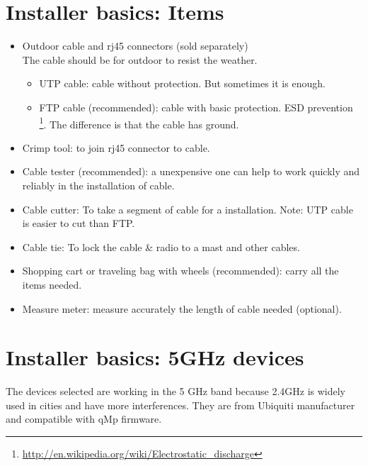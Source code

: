 \documentclass[11pt]{article}
\begin{document}
\section{Installer basics: Items}
\label{sec-2}
\begin{itemize}
\item Outdoor cable and rj45 connectors (sold separately) \\
  The cable should be for outdoor to resist the weather. 
\begin{itemize}
\item UTP cable: cable without protection. But sometimes it is enough.
\item FTP cable (recommended): cable with basic protection. ESD
prevention \footnote{\url{http://en.wikipedia.org/wiki/Electrostatic_discharge}}. The difference is that the cable has
ground.
\end{itemize}
\item Crimp tool: to join rj45 connector to cable.
\item Cable tester (recommended): a unexpensive one can help to work quickly and
reliably in the installation of cable.
\item Cable cutter: To take a segment of cable for a installation. Note:
UTP cable is easier to cut than FTP.
\item Cable tie: To lock the cable \& radio to a mast and other
cables.
\item Shopping cart or traveling bag with wheels (recommended): carry
all the items needed.
\item Measure meter: measure accurately the length of cable needed
(optional).
\end{itemize}
\section{Installer basics: 5GHz devices}
\label{sec-3}
The devices selected are working in the 5 GHz band because 2.4GHz is widely
used in cities and have more interferences. They are from Ubiquiti
manufacturer and compatible with qMp firmware.
\end{document}
